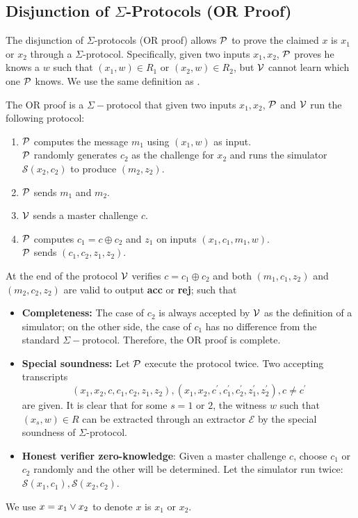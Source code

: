 \subsection{Disjunction of $\Sigma$-Protocols (OR Proof)}
The disjunction of $\Sigma$-protocols (OR proof) allows $\mathcal{P}$ to prove the claimed $x$ is $x_1$ or $x_2$ through a $\Sigma$-protocol. Specifically, given two inputs $x_1,x_2$, $\mathcal{P}$ proves he knows a $w$ such that $(x_1,w)\in{R_1}$ or $(x_2,w)\in{R_2}$, but $\mathcal{V}$ cannot learn which one $\mathcal{P}$ knows. We use the same definition as \cite{damgard10}.
\begin{definition}
The OR proof is a $\Sigma-$protocol that given two inputs $x_1,x_2$, $\mathcal{P}$ and $\mathcal{V}$ run the following protocol:
\begin{enumerate}
    \item $\mathcal{P}$ computes the message $m_1$ using $(x_1,w)$ as input. \\
    $\mathcal{P}$ randomly generates $c_2$ as the challenge for $x_2$ and runs the simulator $\mathcal{S}(x_2,c_2)$ to produce $(m_2,z_2)$.
    \item $\mathcal{P}$ sends $m_1$ and $m_2$.
    \item $\mathcal{V}$ sends a master challenge $c$.
    \item $\mathcal{P}$ computes $c_1=c\oplus{c_2}$ and $z_1$ on inputs $(x_1,c_1,m_1,w)$. \\
    $\mathcal{P}$ sends $(c_1,c_2,z_1,z_2)$.
\end{enumerate}
At the end of the protocol $\mathcal{V}$ verifies $c=c_1\oplus{c_2}$ and both $(m_1,c_1,z_2)$ and $(m_2,c_2,z_2)$ are valid to output \textbf{acc} or \textbf{rej}; such that
\begin{itemize}
    \item \textbf{Completeness:} The case of $c_2$ is always accepted by $\mathcal{V}$ as the definition of a simulator; on the other side, the case of $c_1$ has no difference from the standard $\Sigma-$protocol. Therefore, the OR proof is complete.
    \item \textbf{Special soundness:} Let $\mathcal{P}$ execute the protocol twice. Two accepting transcripts
    \[ (x_1,x_2,c,c_1,c_2,z_1,z_2),(x_1,x_2,c^\prime,c_1^\prime,c_2^\prime,z_1^\prime,z_2^\prime),c\ne{c^\prime} \] 
    are given. It is clear that for some $s=1$ or $2$, the witness $w$ such that $(x_s,w)\in{R}$ can be extracted through an extractor $\mathcal{E}$ by the special soundness of $\Sigma$-protocol.
    \item \textbf{Honest verifier zero-knowledge}: Given a master challenge $c$, choose $c_1$ or $c_2$ randomly and the other will be determined. Let the simulator run twice: $\mathcal{S}(x_1,c_1),\mathcal{S}(x_2,c_2)$.
\end{itemize}
\end{definition}
We use $x={x_1\lor{x_2}}$ to denote $x$ is $x_1$ or $x_2$.

